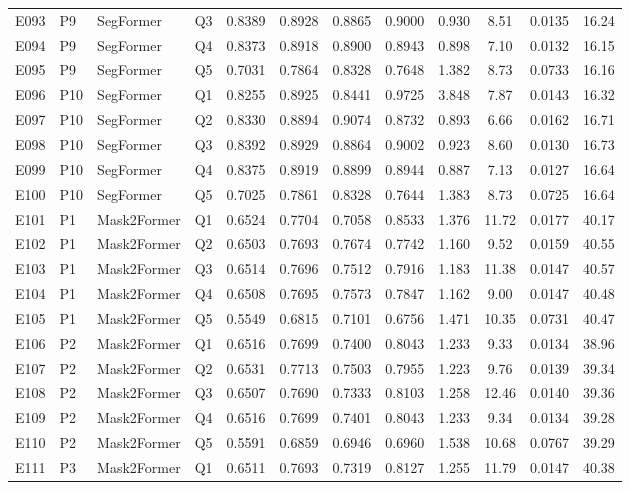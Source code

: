 \begin{longtable}{@{}lllllccccccc@{}}
E093 & P9 & SegFormer & Q3 & 0.8389 & 0.8928 & 0.8865 & 0.9000 & 0.930 & 8.51 & 0.0135 & 16.24 \\
E094 & P9 & SegFormer & Q4 & 0.8373 & 0.8918 & 0.8900 & 0.8943 & 0.898 & 7.10 & 0.0132 & 16.15 \\
E095 & P9 & SegFormer & Q5 & 0.7031 & 0.7864 & 0.8328 & 0.7648 & 1.382 & 8.73 & 0.0733 & 16.16 \\
E096 & P10 & SegFormer & Q1 & 0.8255 & 0.8925 & 0.8441 & 0.9725 & 3.848 & 7.87 & 0.0143 & 16.32 \\
E097 & P10 & SegFormer & Q2 & 0.8330 & 0.8894 & 0.9074 & 0.8732 & 0.893 & 6.66 & 0.0162 & 16.71 \\
E098 & P10 & SegFormer & Q3 & 0.8392 & 0.8929 & 0.8864 & 0.9002 & 0.923 & 8.60 & 0.0130 & 16.73 \\
E099 & P10 & SegFormer & Q4 & 0.8375 & 0.8919 & 0.8899 & 0.8944 & 0.887 & 7.13 & 0.0127 & 16.64 \\
E100 & P10 & SegFormer & Q5 & 0.7025 & 0.7861 & 0.8328 & 0.7644 & 1.383 & 8.73 & 0.0725 & 16.64 \\
E101 & P1 & Mask2Former & Q1 & 0.6524 & 0.7704 & 0.7058 & 0.8533 & 1.376 & 11.72 & 0.0177 & 40.17 \\
E102 & P1 & Mask2Former & Q2 & 0.6503 & 0.7693 & 0.7674 & 0.7742 & 1.160 & 9.52 & 0.0159 & 40.55 \\
E103 & P1 & Mask2Former & Q3 & 0.6514 & 0.7696 & 0.7512 & 0.7916 & 1.183 & 11.38 & 0.0147 & 40.57 \\
E104 & P1 & Mask2Former & Q4 & 0.6508 & 0.7695 & 0.7573 & 0.7847 & 1.162 & 9.00 & 0.0147 & 40.48 \\
E105 & P1 & Mask2Former & Q5 & 0.5549 & 0.6815 & 0.7101 & 0.6756 & 1.471 & 10.35 & 0.0731 & 40.47 \\
E106 & P2 & Mask2Former & Q1 & 0.6516 & 0.7699 & 0.7400 & 0.8043 & 1.233 & 9.33 & 0.0134 & 38.96 \\
E107 & P2 & Mask2Former & Q2 & 0.6531 & 0.7713 & 0.7503 & 0.7955 & 1.223 & 9.76 & 0.0139 & 39.34 \\
E108 & P2 & Mask2Former & Q3 & 0.6507 & 0.7690 & 0.7333 & 0.8103 & 1.258 & 12.46 & 0.0140 & 39.36 \\
E109 & P2 & Mask2Former & Q4 & 0.6516 & 0.7699 & 0.7401 & 0.8043 & 1.233 & 9.34 & 0.0134 & 39.28 \\
E110 & P2 & Mask2Former & Q5 & 0.5591 & 0.6859 & 0.6946 & 0.6960 & 1.538 & 10.68 & 0.0767 & 39.29 \\
E111 & P3 & Mask2Former & Q1 & 0.6511 & 0.7693 & 0.7319 & 0.8127 & 1.255 & 11.79 & 0.0147 & 40.38 \\

\end{longtable}
